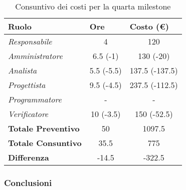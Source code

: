\begin{table}[H]
    \centering
    \begin{tabular}{|l|c|c|}
    \hline
    \textbf{Ruolo} & \multicolumn{1}{l|}{\textbf{Ore}} & \multicolumn{1}{l|}{\textbf{Costo (€)}} \\ \hline
    \textit{Responsabile}      & 4           & 120            \\ \hline
    \textit{Amministratore}    & 6.5 (-1)    & 130 (-20)      \\ \hline
    \textit{Analista}          & 5.5 (-5.5)   & 137.5 (-137.5)   \\ \hline
    \textit{Progettista}       & 9.5 (-4.5)   & 237.5 (-112.5)   \\ \hline
    \textit{Programmatore}     & -           & -              \\ \hline
    \textit{Verificatore}      & 10 (-3.5) & 150 (-52.5)  \\ \hline
    \textbf{Totale Preventivo} & 50          & 1097.5         \\ \hline
    \textbf{Totale Consuntivo} & 35.5        & 775            \\ \hline
    \textbf{Differenza}        & -14.5       & -322.5         \\ \hline
    \end{tabular}
    \caption{Consuntivo dei costi per la quarta milestone}
\end{table}

\subsubsection{Conclusioni}
\begin{comment}
Il consuntivo può chiaramente evidenziare che il gruppo non è riuscito a rimanere in linea con quanto preventivato.
\\I ruoli in cui si possono notare differenze dal preventivo sono i seguenti: \textit{Amministratore} (-1 ora svolta), \textit{Analista} (-5.5 ore svolte), \textit{Progettista} (-4.5 ore svolte) e \textit{Verificatore} (-3.5 ore svolte).
In seguito alla diversità tra preventivo e consuntivo si può notare una riduzione della spesa totale preventivata di 322.5€ e una riduzione delle ore produttive pari a 14.5.
\\Tra le principali cause di questa disuguaglianza tra quanto preventivato e quanto consuntivato possiamo individuare:
    \begin{itemize}
        \item La presenza della sessione d'esami che ha occupato più tempo del previsto per alcuni membri del gruppo;
        \item L'errata stima di disponibilità oraria di alcuni membri del gruppo.
    \end{itemize}
Dato il ripetuto errore nella stime di ore disponibili il gruppo ha deciso che ogni membro dovrà ritagliarsi una porzione di tempo per pensare più nello specifico alla propria disponibilità oraria in modo da evitare di commettere errori simili.
\\Il budget rimanente è di \num{10942.5}€.
\end{comment}


